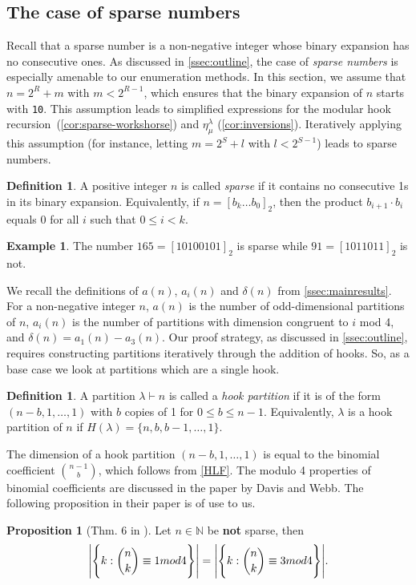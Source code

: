 \documentclass[12pt]{amsart}
\theoremstyle{definition}
\newtheorem{definition}[theorem]{Definition}
\newtheorem{example}[theorem]{Example}
\newtheorem{proposition}[theorem]{Proposition}
\numberwithin{equation}{section}
\newcommand{\workhorse}{modular hook recursion}
\begin{document}
\subsection{The case of sparse numbers}
Recall that a sparse number is a non-negative integer whose binary expansion has no consecutive ones.
As discussed in \cref{ssec:outline}, the case of \textit{sparse numbers} is especially amenable to our enumeration methods. In this section, we assume that $n = 2^{R} + m$ with $m < 2^{R-1}$, which ensures that the binary expansion of $n$ starts with \texttt{10}. This assumption leads to simplified expressions for the \workhorse\, (\cref{cor:sparse-workshorse}) and $\eta^\lambda_\mu$ (\cref{cor:inversions}). Iteratively applying this assumption (for instance, letting $m = 2^S + l$ with $l < 2^{S-1}$) leads to sparse numbers.
\begin{definition}\label{def:sparse}
A positive integer $n$ is called \textit{sparse} if it contains no consecutive 1s in its binary expansion. Equivalently, if $n = [b_k\ldots b_0]_2$, then the product $b_{i+1}\cdot b_i$ equals $0$ for all $i$ such that $0 \leq i < k$.
\end{definition}
\begin{example}
The number $165 = [{10100101}]_2$ is sparse while $91 = [{1011011}]_2$ is not.
\end{example}
We recall the definitions of $a(n)$, $a_i(n)$ and $\delta(n)$ from \cref{ssec:mainresults}. For a non-negative integer $n$, $a(n)$ is the number of odd-dimensional partitions of $n$, $a_i(n)$ is the number of partitions with dimension congruent to $i$ mod 4, and $\delta(n) = a_1(n) - a_3(n)$. Our proof strategy, as discussed in \cref{ssec:outline}, requires constructing partitions iteratively through the addition of hooks. So, as a base case we look at partitions which are a single hook.
\begin{definition}\label{def:hooks}
A partition $\lambda\vdash n$ is called a \textit{hook partition} if it is of the form $(n-b,1, \ldots, 1)$ with $b$ copies of 1 for $0
\leq b \leq n-1$. Equivalently, $\lambda$ is a hook partition of $n$ if $H(\lambda) = \{n, b,b-1, \ldots, 1\}$.
\end{definition}
The dimension of a hook partition $(n-b,1, \ldots, 1)$ is equal to the binomial coefficient $\binom{n-1}{b}$, which follows from \cref{HLF}. The modulo 4 properties of binomial coefficients are discussed in the paper \cite{Bin4} by Davis and Webb. The following proposition in their paper is of use to us.
\begin{proposition}[Thm. 6 in  \cite{Bin4}]\label{davisandwebb}
Let $n\in \mathbb{N}$ be \textbf{not} sparse, then
\[
\Bigg|\Bigg\{k:\binom{n}{k}\equiv 1 \textnormal{ mod } 4\Bigg\}\Bigg| = \Bigg|\Bigg\{k: \binom{n}{k}\equiv 3\textnormal{ mod } 4\Bigg\}\Bigg|.
\]
\end{proposition}
\end{document}
